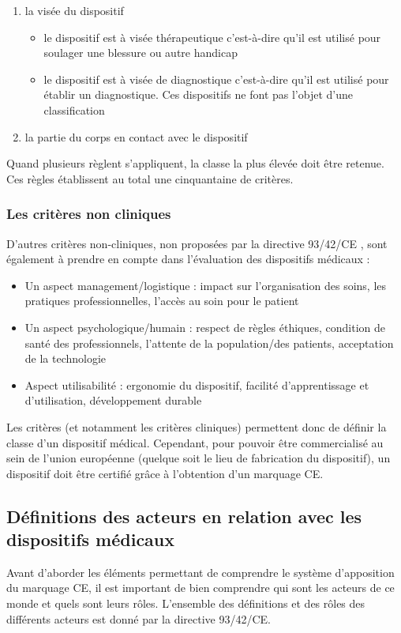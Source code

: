 \begin{enumerate}
\item la visée du dispositif 
    \begin{itemize}
        \item le dispositif est à visée thérapeutique c'est-à-dire qu'il est utilisé pour soulager une blessure ou autre handicap
        \item le dispositif est à visée de diagnostique c'est-à-dire qu'il est utilisé pour établir un diagnostique. Ces dispositifs ne font pas l'objet d'une classification 
    \end{itemize}
\item la partie du corps en contact avec le dispositif
\end{enumerate}

Quand plusieurs règlent s’appliquent, la classe la plus élevée doit être retenue.
Ces règles établissent au total une cinquantaine de critères.

\subsubsection{Les critères non cliniques}

D'autres critères non-cliniques, non proposées par la directive 93/42/CE \cite{Directive93/42/CEE}, sont également à prendre en compte dans l'évaluation des dispositifs médicaux : 

\begin{itemize}
\item Un aspect management/logistique : impact sur l’organisation des soins, les pratiques professionnelles, l’accès au soin pour le patient
\item Un aspect psychologique/humain : respect de règles éthiques, condition de santé des professionnels, l’attente de la population/des patients, acceptation de la technologie
\item Aspect utilisabilité : ergonomie du dispositif, facilité d’apprentissage et d’utilisation, développement durable
\end{itemize}

Les critères (et notamment les critères cliniques) permettent donc de définir la classe d'un dispositif médical. Cependant, pour pouvoir être commercialisé au sein de l'union européenne (quelque soit le lieu de fabrication du dispositif), un dispositif doit être certifié grâce à l'obtention d'un marquage CE.
\subsection{Définitions des acteurs en relation avec les dispositifs médicaux}
Avant d'aborder les éléments permettant de comprendre le système d'apposition du marquage CE, il est important de bien comprendre qui sont les acteurs de ce monde et quels sont leurs rôles. L'ensemble des définitions et des rôles des différents acteurs est donné par la directive 93/42/CE.

